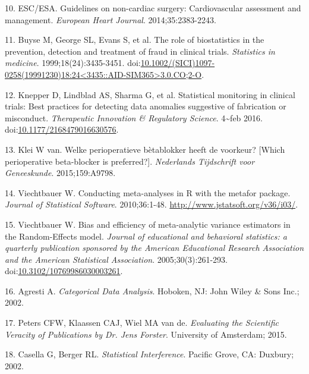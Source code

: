 \documentclass[]{article}
\begin{document}
\hypertarget{ref-esc2014}{}
10. ESC/ESA. Guidelines on non-cardiac surgery: Cardiovascular
assessment and management. \emph{European Heart Journal}.
2014;35:2383-2243.

\hypertarget{ref-Buyse1999-jq}{}
11. Buyse M, George SL, Evans S, et al. The role of biostatistics in the
prevention, detection and treatment of fraud in clinical trials.
\emph{Statistics in medicine}. 1999;18(24):3435-3451.
doi:\href{https://doi.org/10.1002/(SICI)1097-0258(19991230)18:24\%3C3435::AID-SIM365\%3E3.0.CO;2-O}{10.1002/(SICI)1097-0258(19991230)18:24\textless{}3435::AID-SIM365\textgreater{}3.0.CO;2-O}.

\hypertarget{ref-Knepper2016-la}{}
12. Knepper D, Lindblad AS, Sharma G, et al. Statistical monitoring in
clinical trials: Best practices for detecting data anomalies suggestive
of fabrication or misconduct. \emph{Therapeutic Innovation \& Regulatory
Science}. 4\textasciitilde{}feb 2016.
doi:\href{https://doi.org/10.1177/2168479016630576}{10.1177/2168479016630576}.

\hypertarget{ref-klei2015}{}
13. Klei W van. Welke perioperatieve bètablokker heeft de voorkeur?
{[}Which perioperative beta-blocker is preferred?{]}. \emph{Nederlands
Tijdschrift voor Geneeskunde}. 2015;159:A9798.

\hypertarget{ref-viechtbauer2010}{}
14. Viechtbauer W. Conducting meta-analyses in R with the metafor
package. \emph{Journal of Statistical Software}. 2010;36:1-48.
\url{http://www.jstatsoft.org/v36/i03/}.

\hypertarget{ref-viechtbauer2005}{}
15. Viechtbauer W. Bias and efficiency of meta-analytic variance
estimators in the Random-Effects model. \emph{Journal of educational and
behavioral statistics: a quarterly publication sponsored by the American
Educational Research Association and the American Statistical
Association}. 2005;30(3):261-293.
doi:\href{https://doi.org/10.3102/10769986030003261}{10.3102/10769986030003261}.

\hypertarget{ref-agresti2002}{}
16. Agresti A. \emph{Categorical Data Analysis}. Hoboken, NJ: John Wiley
\& Sons Inc.; 2002.

\hypertarget{ref-peters2015}{}
17. Peters CFW, Klaassen CAJ, Wiel MA van de. \emph{Evaluating the
Scientific Veracity of Publications by Dr. Jens Forster}. University of
Amsterdam; 2015.

\hypertarget{ref-casella2002}{}
18. Casella G, Berger RL. \emph{Statistical Interference}. Pacific
Grove, CA: Duxbury; 2002.
\end{document}
